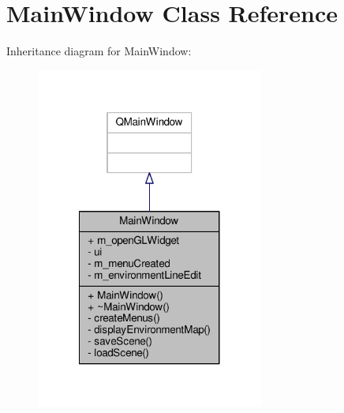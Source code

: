 \hypertarget{class_main_window}{\section{Main\-Window Class Reference}
\label{class_main_window}
}


Inheritance diagram for Main\-Window\-:
\nopagebreak
\begin{figure}[H]
\begin{center}
\leavevmode
\includegraphics[width=212pt]{class_main_window__inherit__graph}
\end{center}
\end{figure}


